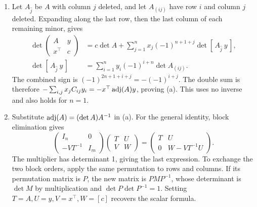 \begin{solution}
\begin{enumerate}
\item Let \(A_{\widehat j}\) be \(A\) with column \(j\) deleted, and
let \(A_{(ij)}\) have row \(i\) and column \(j\) deleted.
Expanding along the last row, then the last column of each remaining minor,
gives
\[
\begin{aligned}
\det\begin{pmatrix}A&y\\x^\top&c\end{pmatrix}
&=c\det A+\sum_{j=1}^n x_j(-1)^{n+1+j}\det[\,A_{\widehat j}\ y\,],\\
\det[\,A_{\widehat j}\ y\,]
&=\sum_{i=1}^n y_i(-1)^{i+n}\det A_{(ij)}.
\end{aligned}
\]
The combined sign is \((-1)^{2n+1+i+j}=-(-1)^{i+j}\).
The double sum is therefore
\(-\sum_{i,j}x_jC_{ij}y_i=-x^\top\operatorname{adj}(A)y\), proving (a).
This uses no inverse and also holds for \(n=1\).
\item Substitute \(\operatorname{adj}(A)=(\det A)A^{-1}\) in (a).
For the general identity, block elimination gives
\[
\begin{pmatrix}I_n&0\\-VT^{-1}&I_m\end{pmatrix}
\begin{pmatrix}T&U\\V&W\end{pmatrix}
=\begin{pmatrix}T&U\\0&W-VT^{-1}U\end{pmatrix}.
\]
The multiplier has determinant 1, giving the last expression.
To exchange the two block orders, apply the same permutation to rows and
columns. If its permutation matrix is \(P\), the new matrix is
\(PMP^{-1}\), whose determinant is \(\det M\) by multiplication and
\(\det P\det P^{-1}=1\).
Setting \(T=A,U=y,V=x^\top,W=[c]\) recovers the scalar formula.
\end{enumerate}
\end{solution}

